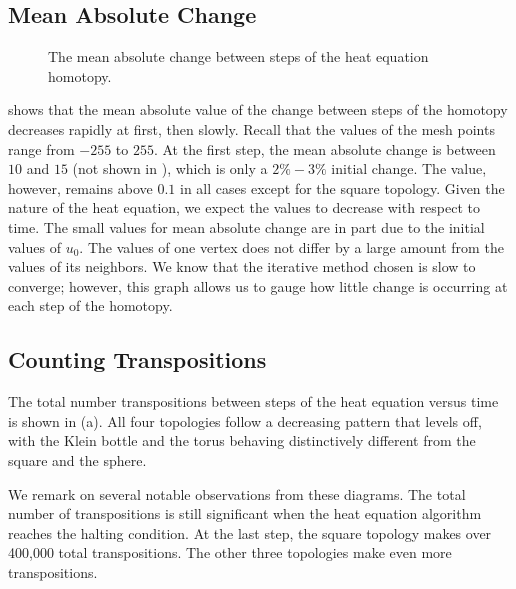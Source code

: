 \subsection{Mean Absolute Change}
\begin{figure}[hbt]
 \vspace*{0.1in}
 \centering
 \centerline{}
 \caption{The mean absolute change between steps of the heat equation homotopy.}
 \label{fig:meanChange}
\end{figure}
 shows that the mean absolute value of the change 
between steps
of the homotopy decreases rapidly at first, then slowly.  Recall that the values of the 
mesh points range from $-255$ to $255$.  At the first step, the mean
absolute change is between $10$ and $15$ (not shown in ), 
which is only a $2\%-3\%$ initial change.  The value, 
however, remains above $0.1$ in all cases except for the square
topology.  Given the nature of the heat equation,
we expect the values to decrease with respect to time.
The small values for mean absolute change are in part due to the initial values of
$u_0$.  The values of one vertex does not differ by a large amount from the values
of its neighbors.  
We know
that the iterative method chosen is slow to converge; however, this
graph allows us to gauge how little change is occurring at each step of the
homotopy.

\subsection{Counting Transpositions}
The total number transpositions between steps of the heat equation versus 
time is shown in (a).  All four topologies follow a 
decreasing pattern that levels off, with the Klein bottle and the torus behaving
distinctively different from the square and the sphere.  

We remark on several notable observations from these diagrams.  
The total number of transpositions is 
still significant when the heat equation algorithm reaches
the halting condition.  At the last step, the square topology makes over
400,000 total transpositions.  The other three topologies make even more
transpositions.

